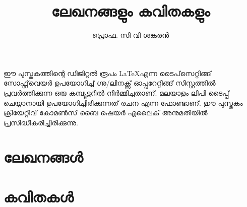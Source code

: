 \documentclass[12pt,a4paper,oneside]{book}
\title{\fontsize{40pt}{1em}\selectfont \color{white}ലേഖനങ്ങളും കവിതകളും}
\author{\fontsize{20pt}{1em}\selectfont \color{white} പ്രൊഫ. സി വി ശങ്കരൻ}
\date{}
\renewcommand{\headrulewidth}{1pt}
\renewcommand{\footrulewidth}{1pt}
\begin{document}
\pagecolor{Maroon}
\maketitle
{}
\pagecolor{white}
\newpage
\renewcommand{\headrulewidth}{0pt}
\renewcommand{\footrulewidth}{0pt}
\vspace*{\fill}
\noindent
ഈ പുസ്തകത്തിന്റെ ഡിജിറ്റൽ രൂപം \LaTeX എന്ന ടൈപ്‌സെറ്റിങ്ങ് സോഫ്റ്റ്‌വെയർ ഉപയോഗിച്ച് ഗ്നു/ലിനക്സ് ഓപ്പറേറ്റിങ്ങ് സിസ്റ്റത്തിൽ പ്രവർത്തിക്കുന്ന ഒരു കമ്പ്യൂട്ടറിൽ നിർമ്മിച്ചതാണ്. മലയാളം ലിപി ടൈപ്പ് ചെയ്യാനായി ഉപയോഗിച്ചിരിക്കുന്നത് രചന എന്ന ഫോണ്ടാണ്. ഈ പുസ്തകം ക്രിയേറ്റീവ് കോമൺസ് ബൈ ഷെയർ എലൈക് അനുമതിയിൽ പ്രസിദ്ധീകരിച്ചിരിക്കുന്നു.
\newpage
\tableofcontents
\newpage
\renewcommand{\headrulewidth}{1pt}
\renewcommand{\footrulewidth}{1pt}
\onehalfspacing
\makeatletter
\renewcommand{\@chapapp}{ലേഖനം}
\part{ലേഖനങ്ങൾ}

\setcounter{page}{1} %






\makeatletter
\renewcommand{\@chapapp}{കവിത}
\makeatother
\part{കവിതകൾ}

\setcounter{page}{19}
\setcounter{chapter}{0}










\newpage
\pagecolor{Maroon}
\newpage\null\thispagestyle{empty}\newpage %
\end{document}
